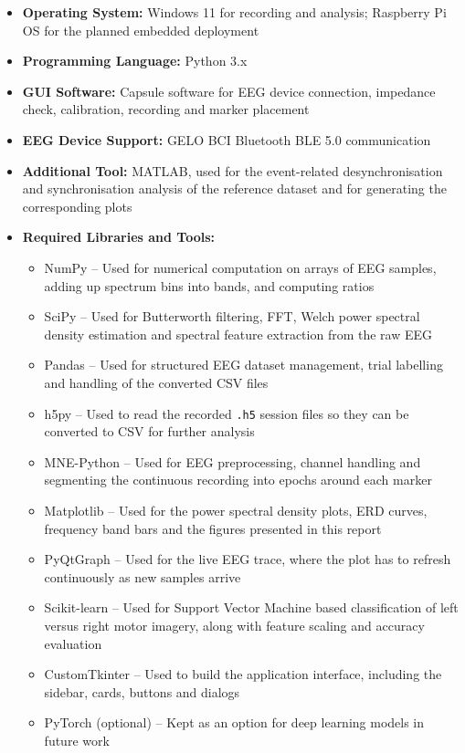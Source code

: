 \begin{itemize}
    \item \textbf{Operating System:} Windows 11 for recording and analysis; Raspberry Pi OS
          for the planned embedded deployment
    \item \textbf{Programming Language:} Python 3.x
    \item \textbf{GUI Software:} Capsule software for EEG device connection, impedance
          check, calibration, recording and marker placement
    \item \textbf{EEG Device Support:} GELO BCI Bluetooth BLE 5.0 communication
    \item \textbf{Additional Tool:} MATLAB, used for the event-related desynchronisation
          and synchronisation analysis of the reference dataset and for generating the
          corresponding plots
    \item \textbf{Required Libraries and Tools:}
    \begin{itemize}
        \item NumPy -- Used for numerical computation on arrays of EEG samples, adding up
              spectrum bins into bands, and computing ratios
        \item SciPy -- Used for Butterworth filtering, FFT, Welch power spectral density
              estimation and spectral feature extraction from the raw EEG
        \item Pandas -- Used for structured EEG dataset management, trial labelling and
              handling of the converted CSV files
        \item h5py -- Used to read the recorded \texttt{.h5} session files so they can be
              converted to CSV for further analysis
        \item MNE-Python \cite{gramfort2013mne} -- Used for EEG preprocessing, channel
              handling and segmenting the continuous recording into epochs around each
              marker
        \item Matplotlib -- Used for the power spectral density plots, ERD curves,
              frequency band bars and the figures presented in this report
        \item PyQtGraph -- Used for the live EEG trace, where the plot has to refresh
              continuously as new samples arrive
        \item Scikit-learn \cite{pedregosa2011sklearn} -- Used for Support Vector Machine
              based classification of left versus right motor imagery, along with feature
              scaling and accuracy evaluation
        \item CustomTkinter -- Used to build the application interface, including the
              sidebar, cards, buttons and dialogs
        \item PyTorch (optional) -- Kept as an option for deep learning models in future
              work
    \end{itemize}
\end{itemize}

